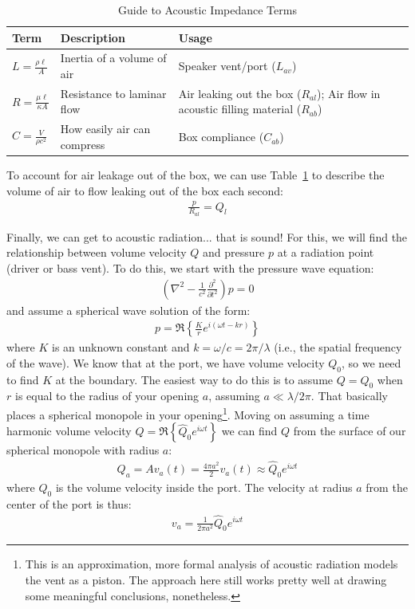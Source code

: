 \documentclass[10pt]{book}
\begin{document}
\begin{table}
\centering
\renewcommand{\arraystretch}{1.5}
\begin{tabularx}{\textwidth}{@{} l X X @{}}
\toprule
Term & Description & Usage \\
\midrule
$L = \frac{\rho \ell}{A}$ & Inertia of a volume of air & Speaker vent/port ($L_{av}$)  \\ 
$R = \frac{\mu \ell }{\kappa A}$ & Resistance to laminar flow &
Air leaking out the box ($R_{al}$); Air flow in acoustic filling material ($R_{ab}$)\\
$C = \frac{V}{\rho c^2}$ & How easily air can compress & Box compliance ($C_{ab}$)\\
\bottomrule
\end{tabularx}
\caption{Guide to Acoustic Impedance Terms}\label{table:acoustic}
\end{table}

To account for air leakage out of the box, we can use Table~\ref{table:acoustic} to describe the volume of air to flow leaking out of the box each second:
\begin{align}
\frac{p}{R_{al}} = Q_l
\end{align}


Finally, we can get to acoustic radiation... that is sound! For this, we will find the relationship between volume velocity $Q$ and pressure $p$ at a radiation point (driver or bass vent). To do this, we start with the pressure wave equation:
\begin{align}
\left(\nabla^2-\frac{1}{c^2}\frac{\partial^2}{\partial t^2}\right)p=0
\end{align}
and assume a spherical wave solution of the form:
\begin{align}
p=\Re \left\{ \frac{K}{r} e^{i(\omega t - k r)} \right\}
\end{align}
where $K$ is an unknown constant and $k=\omega/c=2\pi/\lambda$ (i.e., the spatial frequency of the wave). We know that at the port, we have volume velocity $Q_0$, so we need to find $K$ at the boundary. The easiest way to do this is to assume $Q=Q_0$ when $r$ is equal to the radius of your opening $a$, assuming $a\ll \lambda/2\pi$. That basically places a spherical monopole in your opening\footnote{This is an approximation, more formal analysis of acoustic radiation models the vent as a piston. The approach here still works pretty well at drawing some meaningful conclusions, nonetheless.}. Moving on assuming a time harmonic volume velocity $Q=\Re\left\{\hat{Q}_0e^{i\omega t}\right\}$ we can find $Q$ from the surface of our spherical monopole with radius $a$:
\begin{align}
Q_a=Av_a(t)=\frac{4\pi a^2}{2} v_a(t) \approx \hat{Q}_0e^{i\omega t}
\end{align}
where $Q_0$ is the volume velocity inside the port. The velocity at radius $a$ from the center of the port is thus:
\begin{align}
v_a=\frac{1}{2\pi a^2} \hat{Q}_0 e^{i\omega t}
\end{align}
\end{document}
